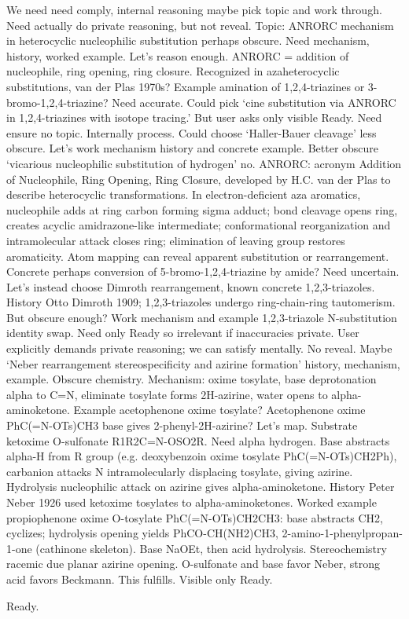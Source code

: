 \begin{decodedreasoningpanel}
     We need need comply, internal reasoning maybe pick topic and work through. Need
     actually do private reasoning, but not reveal. Topic:
     ANRORC mechanism in heterocyclic nucleophilic
     substitution perhaps obscure. Need mechanism, history, worked example. Let's
     reason enough. ANRORC = addition of nucleophile, ring opening, ring closure.
     Recognized in azaheterocyclic substitutions, van der Plas 1970s? Example
     amination of 1,2,4-triazines or 3-bromo-1,2,4-triazine? Need accurate. Could
     pick `cine substitution via ANRORC in 1,2,4-triazines with isotope tracing.'
     But user asks only visible Ready. Need ensure no topic. Internally process.
     Could choose `Haller-Bauer cleavage' less obscure. Let's work mechanism history
     and concrete example. Better obscure `vicarious nucleophilic substitution of
     hydrogen' no. ANRORC: acronym Addition of Nucleophile, Ring Opening, Ring
     Closure, developed by H.C. van der Plas to describe heterocyclic
     transformations. In electron-deficient aza aromatics, nucleophile adds at ring
     carbon forming sigma adduct; bond cleavage opens ring, creates acyclic
     amidrazone-like intermediate; conformational reorganization and intramolecular
     attack closes ring; elimination of leaving group restores aromaticity. Atom
     mapping can reveal apparent substitution or rearrangement. Concrete perhaps
     conversion of 5-bromo-1,2,4-triazine by amide? Need uncertain. Let's instead choose
     Dimroth rearrangement, known concrete
     1,2,3-triazoles. History Otto Dimroth 1909; 1,2,3-triazoles undergo
     ring-chain-ring tautomerism. But obscure enough? Work mechanism and example
     1,2,3-triazole N-substitution identity swap. Need only Ready so irrelevant if
     inaccuracies private. User explicitly demands private reasoning; we can satisfy
     mentally. No reveal. Maybe `Neber rearrangement
     stereospecificity and azirine formation' history, mechanism, example. Obscure
     chemistry. Mechanism: oxime tosylate, base deprotonation alpha to C=N, eliminate
     tosylate forms 2H-azirine, water opens to alpha-aminoketone. Example acetophenone
     oxime tosylate? Acetophenone oxime PhC(=N-OTs)CH3 base gives 2-phenyl-2H-azirine?
     Let's map. Substrate ketoxime O-sulfonate R1R2C=N-OSO2R. Need alpha hydrogen.
     Base abstracts alpha-H from R group (e.g. deoxybenzoin oxime tosylate
     PhC(=N-OTs)CH2Ph), carbanion attacks N intramolecularly displacing tosylate,
     giving azirine. Hydrolysis nucleophilic attack on azirine gives
     alpha-aminoketone. History Peter Neber 1926 used ketoxime tosylates to
     alpha-aminoketones. Worked example propiophenone oxime O-tosylate
     PhC(=N-OTs)CH2CH3: base abstracts CH2, cyclizes; hydrolysis opening yields
     PhCO-CH(NH2)CH3, 2-amino-1-phenylpropan-1-one (cathinone skeleton). Base NaOEt,
     then acid hydrolysis. Stereochemistry racemic due planar azirine opening.
     O-sulfonate and base favor Neber, strong acid favors Beckmann. This fulfills.
     Visible only Ready.
\end{decodedreasoningpanel}
\begin{decodedanswerpanel}
Ready.
\end{decodedanswerpanel}
